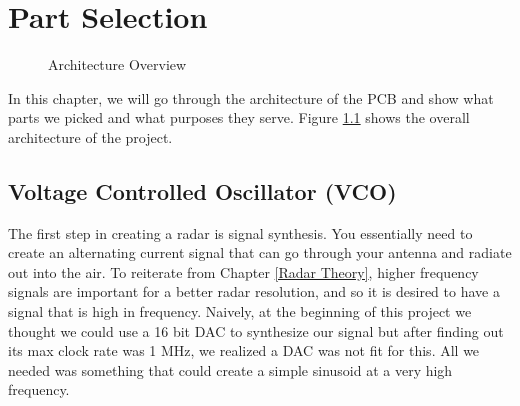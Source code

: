 \chapter{Part Selection
\label{Part Selection}}

\begin{figure}[H]
  \centering
\caption{Architecture Overview}
\label{img:projoverview}
\end{figure}

In this chapter, we will go through the architecture of the PCB and show what parts we picked and what purposes they serve.
Figure \ref{img:projoverview} shows the overall architecture of the project.

\section{Voltage Controlled Oscillator (VCO)}
The first step in creating a radar is signal synthesis. You essentially need to create an alternating current signal that can
go through your antenna and radiate out into the air. To reiterate from Chapter \ref{Radar Theory}, higher frequency signals are
important for a better radar resolution, and so it is desired to have a signal that is high in frequency. Naively, at the
beginning of this project we thought we could use a 16 bit DAC to synthesize our signal but after finding out its max clock rate 
was 1 MHz, we realized a DAC was not fit for this. All we needed was something that could create a simple sinusoid at a very
high frequency.

